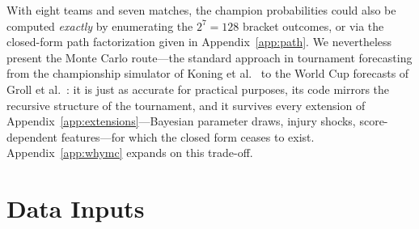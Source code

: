 \documentclass[11pt]{article}
\begin{document}
With eight teams and seven matches, the champion probabilities could also be
computed \emph{exactly} by enumerating the $2^7 = 128$ bracket outcomes, or
via the closed-form path factorization given in Appendix~\ref{app:path}. We
nevertheless present the Monte Carlo route---the standard approach in
tournament forecasting from the championship simulator of Koning et
al.~\cite{koning2003simulation} to the World Cup forecasts of Groll et
al.~\cite{groll2019hybrid}: it is just as accurate for practical
purposes, its code mirrors the recursive structure of the tournament, and it
survives every extension of Appendix~\ref{app:extensions}---Bayesian parameter
draws, injury shocks, score-dependent features---for which the closed form
ceases to exist. Appendix~\ref{app:whymc} expands on this trade-off.

\section{Data Inputs}
\label{sec:data}
\end{document}
